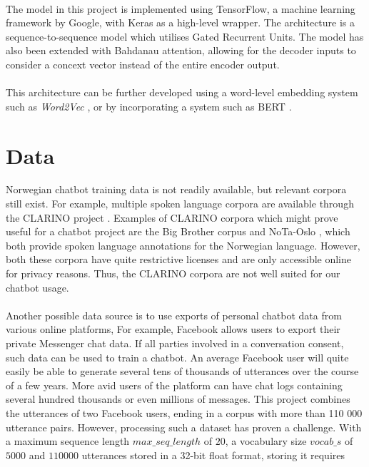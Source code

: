\documentclass{article}
\begin{document}
\paragraph{}
The model in this project is implemented using TensorFlow, a machine learning
framework by Google, with Keras as a high-level wrapper. The architecture is 
a sequence-to-sequence model which utilises Gated Recurrent Units. The model
has also been extended with Bahdanau attention, allowing for the decoder inputs
to consider a concext vector instead of the entire encoder output.

\paragraph{}
This architecture can be further developed using a word-level embedding system
such as \textit{Word2Vec} \cite{word2vec}, or by incorporating a system such
as BERT \cite{bert2018}.

\section*{Data}
Norwegian chatbot training data is not readily available, but relevant corpora
still exist.  For example, multiple spoken language corpora are available
through the CLARINO project \cite{clarino-about}. Examples of CLARINO
corpora which might prove useful for a chatbot project are the Big Brother
corpus \cite{clarino-bb} and NoTa-Oslo \cite{clarino-nota}, which both provide
spoken language annotations for the Norwegian language. However, both these
corpora have quite restrictive licenses and are only accessible online for
privacy reasons. Thus, the CLARINO corpora are not well suited for our chatbot
usage.

\paragraph{}
Another possible data source is to use exports of personal chatbot data from
various online platforms, For example, Facebook allows users to export their
private Messenger chat data. If all parties involved in a conversation consent,
such data can be used to train a chatbot. An average Facebook user will quite
easily be able to generate several tens of thousands of utterances over the
course of a few years. More avid users of the platform can have chat logs
containing several hundred thousands or even millions of messages. This project
combines the utterances of two Facebook users, ending in a corpus with more
than 110 000 utterance pairs. However, processing such a dataset has proven a
challenge. With a maximum sequence length $max\_seq\_length$ of $20$, a
vocabulary size $vocab\_s$ of $5000$ and $110 000$ utterances stored in a
32-bit float format, storing it requires
\end{document}
